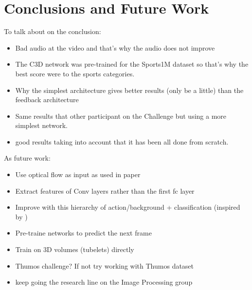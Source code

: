 \chapter{Conclusions and Future Work}

To talk about on the conclusion:
\begin{itemize}
	\item Bad audio at the video and that's why the audio does not improve
    \item The C3D network was pre-trained for the Sports1M dataset so that's why the best score were to the sports categories.
    \item Why the simplest architecture gives better results (only be a little) than the feedback architecture
    \item Same results that other participant on the Challenge but using a more simplest network.
    \item good results taking into account that it has been all done from scratch.
\end{itemize}


As future work:
\begin{itemize}
    \item Use optical flow as input as used in paper \cite{simonyan2014two}\cite{Ng_2015_CVPR}\cite{yao2015describing}
    \item Extract features of Conv layers rather than the first fc layer
    \item Improve with this hierarchy of action/background + classification (inspired by \cite{shoutemporal})
    \item Pre-traine networks to predict the next frame
    \item Train on 3D volumes (tubelets) directly
    \item Thumos challenge? If not try working with Thumos dataset\cite{THUMOS15}
    \item keep going the research line on the Image Processing group

\end{itemize}
